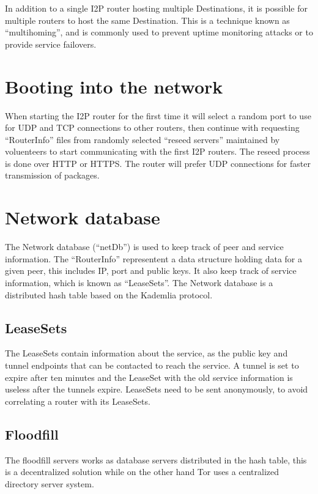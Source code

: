 \documentclass[a4paper,twocolumn,12pt]{article}
\begin{document}
In addition to a single I2P router hosting multiple Destinations, it is possible
for multiple routers to host the same Destination. This is a technique known as
``multihoming'', and is commonly used to prevent uptime monitoring attacks\cite{}
or to provide service failovers.

\section{Booting into the network}

When starting the I2P router for the first time it will select a random port to use for UDP\cite{rfc768}
and TCP connections to other routers, then continue with requesting ``RouterInfo'' files
from randomly selected ``reseed servers'' maintained by voluenteers to start communicating
with the first I2P routers. The reseed process is done over HTTP or HTTPS. The router will prefer
UDP connections for faster transmission of packages.

\section{Network database}

The Network database (``netDb'') is used to keep track of peer and service
information. The ``RouterInfo'' representent a data structure holding data for a
given peer, this includes IP, port and public keys. It also keep track of
service information, which is known as ``LeaseSets''. The Network database is a
distributed hash table based on the Kademlia\cite{Maymounkov:2002:KPI:646334.687801} protocol.

\subsection{LeaseSets}

The LeaseSets contain information about the service, as the public key and
tunnel endpoints that can be contacted to reach the service. A tunnel is set to
expire after ten minutes and the LeaseSet with the old service information is
useless after the tunnels expire. LeaseSets need to be sent anonymously, to avoid
correlating a router with its LeaseSets.

\subsection{Floodfill}

The floodfill servers works as database servers distributed in the hash table,
this is a decentralized solution while on the other hand Tor\cite{tor-design}
uses a centralized directory server system.
\end{document}
